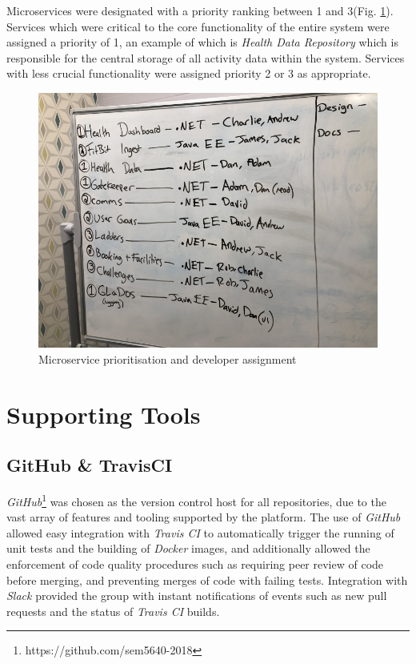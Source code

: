 Microservices were designated with a priority ranking between 1 and 3(Fig. \ref{fig:numbering_microservice_priority}). Services which were critical to the core functionality of the entire system were assigned a priority of 1, an example of which is \textit{Health Data Repository} which is responsible for the central storage of all activity data within the system. Services with less crucial functionality were assigned priority 2 or 3 as appropriate.

\begin{figure}[H]
    \centering
    \includegraphics[width=\textwidth]{Images/Numbering_Microservices.jpg}
    \caption{Microservice prioritisation and developer assignment}
    \label{fig:numbering_microservice_priority}
\end{figure}


\section{Supporting Tools}
\subsection{GitHub \& TravisCI}
\textit{GitHub}\footnote{https://github.com/sem5640-2018} was chosen as the version control host for all repositories, due to the vast array of features and tooling supported by the platform. The use of \textit{GitHub} allowed easy integration with \textit{Travis CI} to automatically trigger the running of unit tests and the building of \textit{Docker} images, and additionally allowed the enforcement of code quality procedures such as requiring peer review of code before merging, and preventing merges of code with failing tests. Integration with \textit{Slack} provided the group with instant notifications of events such as new pull requests and the status of \textit{Travis CI} builds.

